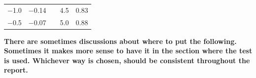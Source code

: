 \begin{table}[H]
\begin{tabular}{|l|l|l| l|l|}
\cline{1-2}\cline{4-5}%
  \SI{-1,0}{}          &       \SI{-0,14}{}  &             & \SI{4.5}{}           & \SI{0.83}{}        \\
\cline{1-2}\cline{4-5}%
  \SI{-0,5}{}          &       \SI{-0,07}{}  &             & \SI{5.0}{}           & \SI{0.88}{}        \\
\cline{1-2}\cline{4-5}%
\end{tabular}                                              %
\end{table}                                                %

\textbf{There are sometimes discussions about where to put the following. Sometimes it makes more sense to have it in the section where the test is used. Whichever way is chosen, should be consistent throughout the report.}

